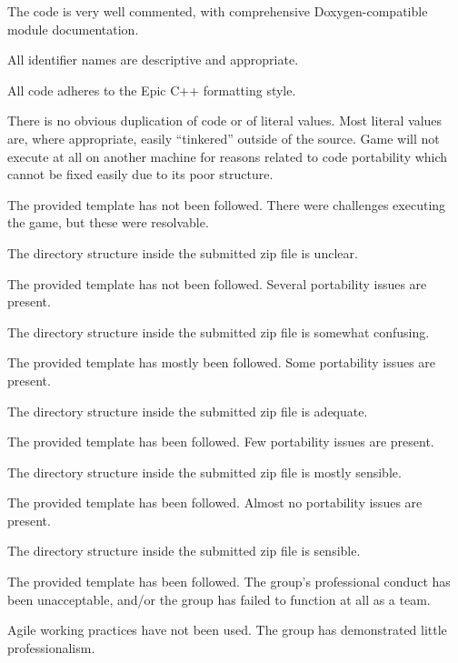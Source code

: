 \documentclass{../../fal_assignment}
\begin{document}
\begin{markingrubric}
        \grade The code is very well commented, with comprehensive Doxygen-compatible module documentation.
            \par All identifier names are descriptive and appropriate.
            \par All code adheres to the Epic C++ formatting style.
             \par There is no obvious duplication of code or of literal values. Most literal values are, where appropriate, easily ``tinkered'' outside of the source.  
%
        \grade\fail Game will not execute at all on another machine for reasons related to code portability which cannot be fixed easily due to its poor structure.
            \par The provided template has not been followed.
        \grade There were challenges executing the game, but these were resolvable.
            \par The directory structure inside the submitted zip file is unclear.
            \par The provided template has not been followed.
        \grade Several portability issues are present.
            \par The directory structure inside the submitted zip file is somewhat confusing.
            \par The provided template has mostly been followed.
        \grade Some portability issues are present.
            \par The directory structure inside the submitted zip file is adequate.
            \par The provided template has been followed.
        \grade Few portability issues are present.
            \par The directory structure inside the submitted zip file is mostly sensible.
            \par The provided template has been followed.
        \grade Almost no portability issues are present.
            \par The directory structure inside the submitted zip file is sensible.
            \par The provided template has been followed.
%
        \grade\fail The group's professional conduct has been unacceptable,
            and/or the group has failed to function at all as a team.
            \par Agile working practices have not been used.
        \grade The group has demonstrated little professionalism.

\end{markingrubric}
\end{document}
